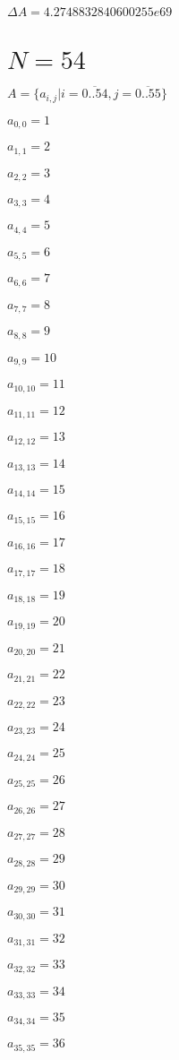 \documentclass[a4paper,12pt]{article}
\begin{document}
$\Delta A = 4.2748832840600255e69$



\section{ $N = 54$ }
$A = \{ a _{ i, j } | i = \overline { 0..54 }, j = \overline { 0..55 } \}$

$a _{ 0, 0 } = 1$

$a _{ 1, 1 } = 2$

$a _{ 2, 2 } = 3$

$a _{ 3, 3 } = 4$

$a _{ 4, 4 } = 5$

$a _{ 5, 5 } = 6$

$a _{ 6, 6 } = 7$

$a _{ 7, 7 } = 8$

$a _{ 8, 8 } = 9$

$a _{ 9, 9 } = 10$

$a _{ 10, 10 } = 11$

$a _{ 11, 11 } = 12$

$a _{ 12, 12 } = 13$

$a _{ 13, 13 } = 14$

$a _{ 14, 14 } = 15$

$a _{ 15, 15 } = 16$

$a _{ 16, 16 } = 17$

$a _{ 17, 17 } = 18$

$a _{ 18, 18 } = 19$

$a _{ 19, 19 } = 20$

$a _{ 20, 20 } = 21$

$a _{ 21, 21 } = 22$

$a _{ 22, 22 } = 23$

$a _{ 23, 23 } = 24$

$a _{ 24, 24 } = 25$

$a _{ 25, 25 } = 26$

$a _{ 26, 26 } = 27$

$a _{ 27, 27 } = 28$

$a _{ 28, 28 } = 29$

$a _{ 29, 29 } = 30$

$a _{ 30, 30 } = 31$

$a _{ 31, 31 } = 32$

$a _{ 32, 32 } = 33$

$a _{ 33, 33 } = 34$

$a _{ 34, 34 } = 35$

$a _{ 35, 35 } = 36$
\end{document}
